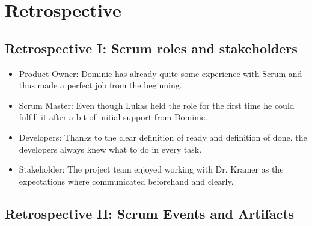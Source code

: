 \section{Retrospective}\label{sec:retrorespective}

\subsection{Retrospective I: Scrum roles and stakeholders}\label{subsec:retrospective-scrum-roles-and-stakeholder}

\begin{itemize}
    \item Product Owner: Dominic has already quite some experience with Scrum and thus made a perfect job from the beginning.
    \item Scrum Master: Even though Lukas held the role for the first time he could fulfill it after a bit of initial support from Dominic.
    \item Developers: Thanks to the clear definition of ready and definition of done, the developers always knew what to do in every task.
    \item Stakeholder: The project team enjoyed working with Dr. Kramer as the expectations where communicated beforehand and clearly.
\end{itemize}

\subsection{Retrospective II: Scrum Events and Artifacts}\label{subsec:retrospective-scrum-events-and-artifacts}

